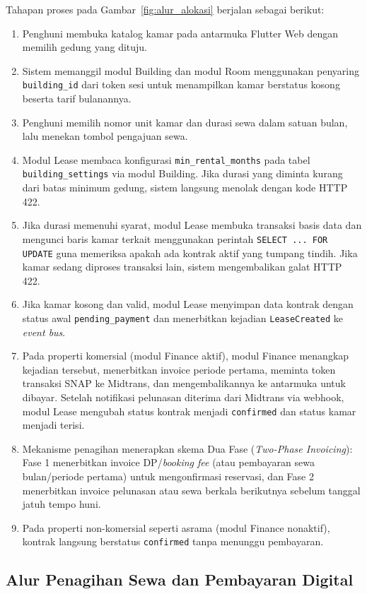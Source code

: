 Tahapan proses pada Gambar~\ref{fig:alur_alokasi} berjalan sebagai berikut:
\begin{enumerate}[label=\arabic*., leftmargin=*]
  \item Penghuni membuka katalog kamar pada antarmuka Flutter Web dengan memilih gedung yang dituju.
  \item Sistem memanggil modul Building dan modul Room menggunakan penyaring \texttt{building\_id} dari token sesi untuk menampilkan kamar berstatus kosong beserta tarif bulanannya.
  \item Penghuni memilih nomor unit kamar dan durasi sewa dalam satuan bulan, lalu menekan tombol pengajuan sewa.
  \item Modul Lease membaca konfigurasi \texttt{min\_rental\_months} pada tabel \texttt{building\_settings} via modul Building. Jika durasi yang diminta kurang dari batas minimum gedung, sistem langsung menolak dengan kode HTTP 422.
  \item Jika durasi memenuhi syarat, modul Lease membuka transaksi basis data dan mengunci baris kamar terkait menggunakan perintah \texttt{SELECT ... FOR UPDATE} guna memeriksa apakah ada kontrak aktif yang tumpang tindih. Jika kamar sedang diproses transaksi lain, sistem mengembalikan galat HTTP 422.
  \item Jika kamar kosong dan valid, modul Lease menyimpan data kontrak dengan status awal \texttt{pending\_payment} dan menerbitkan kejadian \texttt{LeaseCreated} ke \textit{event bus}.
  \item Pada properti komersial (modul Finance aktif), modul Finance menangkap kejadian tersebut, menerbitkan invoice periode pertama, meminta token transaksi SNAP ke Midtrans, dan mengembalikannya ke antarmuka untuk dibayar. Setelah notifikasi pelunasan diterima dari Midtrans via webhook, modul Lease mengubah status kontrak menjadi \texttt{confirmed} dan status kamar menjadi terisi.
  \item Mekanisme penagihan menerapkan skema Dua Fase (\textit{Two-Phase Invoicing}): Fase 1 menerbitkan invoice DP/\textit{booking fee} (atau pembayaran sewa bulan/periode pertama) untuk mengonfirmasi reservasi, dan Fase 2 menerbitkan invoice pelunasan atau sewa berkala berikutnya sebelum tanggal jatuh tempo huni.
  \item Pada properti non-komersial seperti asrama (modul Finance nonaktif), kontrak langsung berstatus \texttt{confirmed} tanpa menunggu pembayaran.
\end{enumerate}

\subsection{Alur Penagihan Sewa dan Pembayaran Digital}

